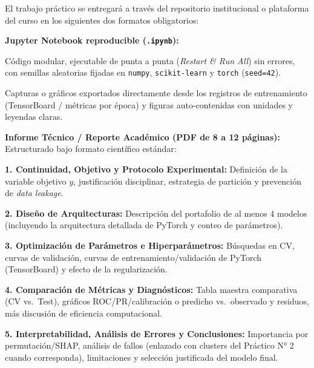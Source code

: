 \documentclass[11pt,a4paper]{article}
\let\origitemize\itemize
\let\endorigitemize\enditemize
\renewenvironment{itemize}{\origitemize\setlength{\itemsep}{2pt}\setlength{\parskip}{0pt}\setlength{\parsep}{0pt}}{\endorigitemize}
\let\origenumerate\enumerate
\let\endorigenumerate\endenumerate
\renewenvironment{enumerate}{\origenumerate\setlength{\itemsep}{2pt}\setlength{\parskip}{0pt}\setlength{\parsep}{0pt}}{\endorigenumerate}
\begin{document}
El trabajo práctico se entregará a través del repositorio institucional o plataforma del curso en los siguientes dos formatos obligatorios:
\begin{enumerate}
    \item \textbf{Jupyter Notebook reproducible (\texttt{.ipynb}):}
    \begin{itemize}
        \item Código modular, ejecutable de punta a punta (\textit{Restart \& Run All}) sin errores, con semillas aleatorias fijadas en \texttt{numpy}, \texttt{scikit-learn} y \texttt{torch} (\texttt{seed=42}).
        \item Capturas o gráficos exportados directamente desde los registros de entrenamiento (TensorBoard / métricas por época) y figuras auto-contenidas con unidades y leyendas claras.
    \end{itemize}
    \item \textbf{Informe Técnico / Reporte Académico (PDF de 8 a 12 páginas):}
    Estructurado bajo formato científico estándar:
    \begin{itemize}
        \item \textbf{1. Continuidad, Objetivo y Protocolo Experimental:} Definición de la variable objetivo $y$, justificación disciplinar, estrategia de partición y prevención de \textit{data leakage}.
        \item \textbf{2. Diseño de Arquitecturas:} Descripción del portafolio de al menos 4 modelos (incluyendo la arquitectura detallada de PyTorch y conteo de parámetros).
        \item \textbf{3. Optimización de Parámetros e Hiperparámetros:} Búsquedas en CV, curvas de validación, curvas de entrenamiento/validación de PyTorch (TensorBoard) y efecto de la regularización.
        \item \textbf{4. Comparación de Métricas y Diagnósticos:} Tabla maestra comparativa (CV vs.\ Test), gráficos ROC/PR/calibración o predicho vs.\ observado y residuos, más discusión de eficiencia computacional.
        \item \textbf{5. Interpretabilidad, Análisis de Errores y Conclusiones:} Importancia por permutación/SHAP, análisis de fallos (enlazado con clusters del Práctico N° 2 cuando corresponda), limitaciones y selección justificada del modelo final.
    \end{itemize}
\end{enumerate}

\newpage
\end{document}
